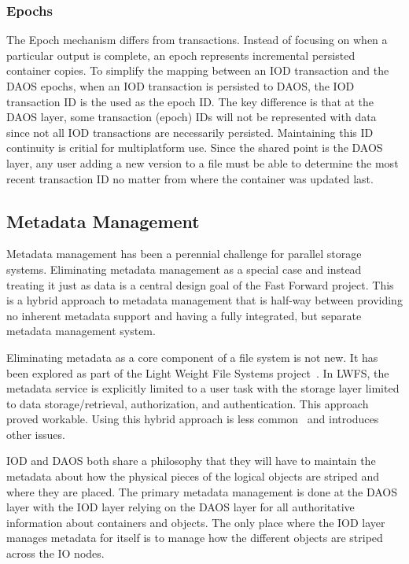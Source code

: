 \documentclass[conference]{IEEEtran}
\begin{document}
\subsubsection{Epochs}
The Epoch mechanism differs from transactions. Instead of focusing on when a
particular output is complete, an epoch represents incremental persisted
container copies.  To simplify the mapping between an IOD transaction and the
DAOS epochs, when an IOD transaction is persisted to DAOS, the IOD transaction
ID is the used as the epoch ID. The key difference is that at the DAOS layer,
some transaction (epoch) IDs will not be represented with data since not all
IOD transactions are necessarily persisted. Maintaining this ID continuity is
critial for multiplatform use. Since the shared point is the DAOS layer, any
user adding a new version to a file must be able to determine the most recent
transaction ID no matter from where the container was updated last.

\subsection{Metadata Management}
Metadata management has been a perennial challenge for parallel storage
systems.  Eliminating metadata management as a special case and instead
treating it just as data is a central design goal of the Fast Forward project.
This is a hybrid approach to metadata management that is half-way between
providing no inherent metadata support and having a fully integrated, but
separate metadata management system.

Eliminating metadata as a core component of a file system is not new. It has
been explored as part of the Light Weight File Systems
project~\cite{oldfield:lwfs}. In LWFS, the metadata service is explicitly
limited to a user task with the storage layer limited to data
storage/retrieval, authorization, and authentication. This approach proved
workable. Using this hybrid approach is less common~\cite{weil:2006:ceph} and
introduces other issues.

IOD and DAOS both share a philosophy that they will have to maintain the
metadata about how the physical pieces of the logical objects are striped and
where they are placed. The primary metadata management is done at the DAOS
layer with the IOD layer relying on the DAOS layer for all authoritative
information about containers and objects. The only place where the IOD layer
manages metadata for itself is to manage how the different objects are striped
across the IO nodes.
\end{document}
